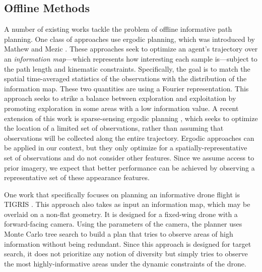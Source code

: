 \subsection{Offline Methods}
%
A number of existing works tackle the problem of offline informative path planning. One class of approaches use ergodic planning, which was introduced by Mathew and Mezic \cite{ergodic2011}. These approaches seek to optimize an agent's trajectory over an \textit{information map}---which represents how interesting each sample is---subject to the path length and kinematic constraints. Specifically, the goal is to match the spatial time-averaged statistics of the observations with the distribution of the information map. These two quantities are using a Fourier representation. This approach seeks to strike a balance between exploration and exploitation by promoting exploration in some areas with a low information value.
A recent extension of this work is sparse-sensing ergodic planning \cite{Rao}, which seeks to optimize the location of 
a limited set of observations, rather than assuming that observations will be collected along the entire trajectory. Ergodic approaches can be applied in our context, but they only optimize for a spatially-representative set of observations and do not consider other features. Since we assume access to prior imagery, we expect that better performance can be achieved by observing a representative set of these appearance features. 

One work that specifically focuses on planning an informative drone flight is TIGRIS \cite{Moon2022TIGRIS:Planning}. This approach also takes as input an information map, which may be overlaid on a non-flat geometry. It is designed for a fixed-wing drone with a forward-facing camera. Using the parameters of the camera, the planner uses Monte Carlo tree search \cite{Browne2012AMethodsEdited} to build a plan that tries to observe areas of high information without being redundant. Since this approach is designed for target search, it does not prioritize any notion of diversity but simply tries to observe the most highly-informative areas under the dynamic constraints of the drone. 

